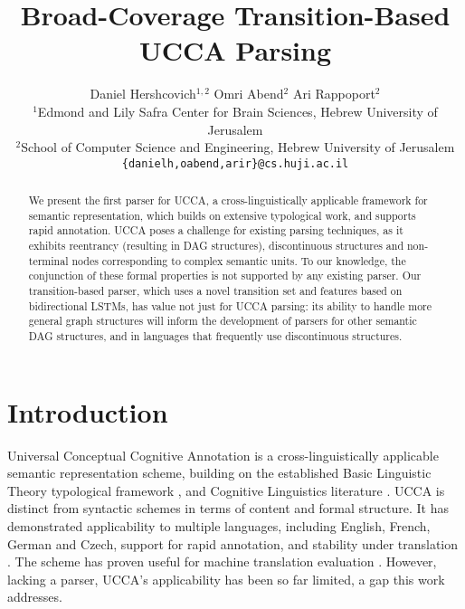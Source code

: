 \documentclass[11pt,a4paper]{article}
\title{Broad-Coverage Transition-Based UCCA Parsing}
\author{Daniel Hershcovich$^{1,2}$ \And Omri Abend$^2$ \And Ari Rappoport$^2$ \\
  $^1$Edmond and Lily Safra Center for Brain Sciences, Hebrew University of Jerusalem \\
  $^2$School of Computer Science and Engineering, Hebrew University of Jerusalem \\
  \texttt{\{danielh,oabend,arir\}@cs.huji.ac.il}
}
\date{}
\begin{document}
\maketitle

\begin{abstract}
  We present the first parser for UCCA, a
  cross-linguistically applicable framework for semantic
  representation, which builds on extensive
  typological work, and supports rapid annotation.
  UCCA poses a challenge for existing parsing techniques,
  as it exhibits reentrancy (resulting in DAG structures),
  discontinuous structures and non-terminal nodes corresponding
  to complex semantic units. To our knowledge, the conjunction
  of these formal properties is not supported by any existing parser.
  Our transition-based parser, which uses a novel transition set
  and features based on bidirectional LSTMs,
  has value not just for UCCA parsing:
  its ability to handle more general graph structures will inform
  the development of parsers for other semantic DAG structures, 
  and in languages that frequently use discontinuous structures.
\end{abstract}


\section{Introduction}\label{sec:introduction}

Universal Conceptual Cognitive Annotation \cite[UCCA,][]{abend2013universal}
is a cross-linguistically applicable semantic representation scheme,
building on the established Basic Linguistic Theory typological framework
\cite{Dixon:10b,Dixon:10a,Dixon:12}, and Cognitive
Linguistics literature \cite{croft2004cognitive}.
UCCA is distinct from syntactic
schemes in terms of content and formal structure.
It has demonstrated applicability to multiple languages, including
English, French, German and Czech, support for rapid annotation,
and stability under translation \cite{sulem2015conceptual}.
The scheme has proven useful for machine translation evaluation \cite{birch2016hume}.
However, lacking a parser, UCCA's applicability has been so far limited,
a gap this work addresses.
\end{document}
